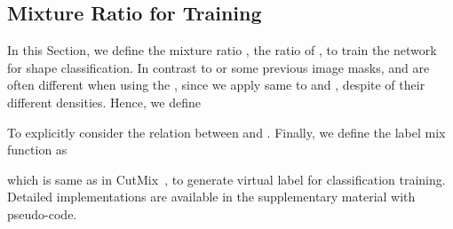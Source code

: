 \documentclass[final]{cvpr}
\begin{document}
\subsection{Mixture Ratio  for Training} \label{subsection:mixture_ratio}
In this Section, we define the mixture ratio , the ratio of  \wrt , to train the network for shape classification. In contrast to  or some previous image masks,  and  are often different when using the , since we apply same  to  and , despite of their different densities. Hence, we define

To explicitly consider the relation between  and . Finally, we define the label mix function as

which is same as in CutMix~\cite{yun2019cutmix}, to generate virtual label  for classification training. Detailed implementations are available in the supplementary material with pseudo-code.
\end{document}
